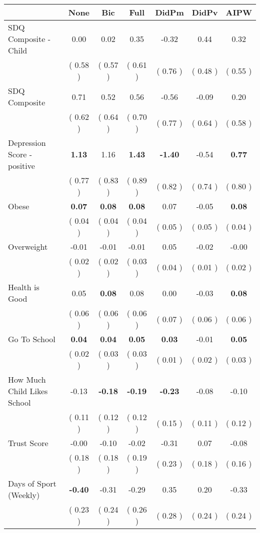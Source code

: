 \begin{tabular}{l c c c c c c}
\toprule
 & None & Bic & Full & DidPm & DidPv & AIPW \\
\midrule
SDQ Composite - Child &      0.00 &      0.02 &      0.35 &     -0.32 &      0.44 &      0.32 \\
& (     0.58 ) & (     0.57 ) & (     0.61 ) & (     0.76 ) & (     0.48 ) & (     0.55 ) \\
SDQ Composite &      0.71 &      0.52 &      0.56 &     -0.56 &     -0.09 &      0.20 \\
& (     0.62 ) & (     0.64 ) & (     0.70 ) & (     0.77 ) & (     0.64 ) & (     0.58 ) \\
Depression Score - positive & \textbf{      1.13 } &      1.16 & \textbf{      1.43 } & \textbf{     -1.40 } &     -0.54 & \textbf{     0.77} \\
& (     0.77 ) & (     0.83 ) & (     0.89 ) & (     0.82 ) & (     0.74 ) & (     0.80 ) \\
Obese & \textbf{      0.07 } & \textbf{      0.08 } & \textbf{      0.08 } &      0.07 &     -0.05 & \textbf{     0.08} \\
& (     0.04 ) & (     0.04 ) & (     0.04 ) & (     0.05 ) & (     0.05 ) & (     0.04 ) \\
Overweight &     -0.01 &     -0.01 &     -0.01 &      0.05 &     -0.02 &     -0.00 \\
& (     0.02 ) & (     0.02 ) & (     0.03 ) & (     0.04 ) & (     0.01 ) & (     0.02 ) \\
Health is Good &      0.05 & \textbf{      0.08 } &      0.08 &      0.00 &     -0.03 & \textbf{     0.08} \\
& (     0.06 ) & (     0.06 ) & (     0.06 ) & (     0.07 ) & (     0.06 ) & (     0.06 ) \\
Go To School & \textbf{      0.04 } & \textbf{      0.04 } & \textbf{      0.05 } & \textbf{      0.03 } &     -0.01 & \textbf{     0.05} \\
& (     0.02 ) & (     0.03 ) & (     0.03 ) & (     0.01 ) & (     0.02 ) & (     0.03 ) \\
How Much Child Likes School &     -0.13 & \textbf{     -0.18 } & \textbf{     -0.19 } & \textbf{     -0.23 } &     -0.08 &     -0.10 \\
& (     0.11 ) & (     0.12 ) & (     0.12 ) & (     0.15 ) & (     0.11 ) & (     0.12 ) \\
Trust Score &     -0.00 &     -0.10 &     -0.02 &     -0.31 &      0.07 &     -0.08 \\
& (     0.18 ) & (     0.18 ) & (     0.19 ) & (     0.23 ) & (     0.18 ) & (     0.16 ) \\
Days of Sport (Weekly) & \textbf{     -0.40 } &     -0.31 &     -0.29 &      0.35 &      0.20 &     -0.33 \\
& (     0.23 ) & (     0.24 ) & (     0.26 ) & (     0.28 ) & (     0.24 ) & (     0.24 ) \\
\bottomrule
\end{tabular}
